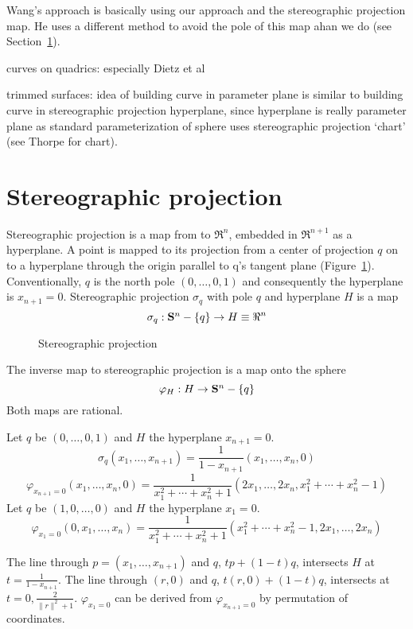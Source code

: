 Wang's approach is basically using our approach and the stereographic projection map.
He uses a different method to avoid the pole of this map
ahan we do (see Section~\ref{}).

curves on quadrics: especially Dietz et al

trimmed surfaces: idea of building curve in parameter plane
is similar to building curve in stereographic projection hyperplane,
since hyperplane is really parameter plane as standard parameterization
of sphere uses stereographic projection `chart' (see Thorpe for chart).


\section{Stereographic projection}

Stereographic projection is a map from  to $\Re^n$,
embedded in $\Re^{n+1}$ as a hyperplane.
A point is mapped to its projection from a center of projection $q$ on 
to a hyperplane through the origin parallel to q's tangent plane (Figure~\ref{fig:stereo}).
Conventionally, $q$ is the north pole $(0,\ldots,0,1)$
and consequently the hyperplane is $x_{n+1}=0$.
Stereographic projection $\sigma_q$ with pole $q$ and hyperplane $H$ is
a map
\[	\sigma_q : \mbox{{\bf S}$^{n}$} - \{ q \} \rightarrow H \equiv \Re^n	\]

\begin{figure}
\vspace{2in}
\caption{Stereographic projection}
\label{fig:stereo}
\end{figure}

The inverse map to stereographic projection is a map onto the sphere
\[	\varphi_H : H \rightarrow \mbox{{\bf S}$^{n}$} - \{ q \}	\]
Both maps are rational.

\begin{lemma}
Let $q$ be $(0,\ldots,0,1)$ and $H$ the hyperplane $x_{n+1}=0$.
\[
	\sigma_q (x_1,\ldots,x_{n+1}) = 
	\frac{1}{1-x_{n+1}} (x_1, \ldots, x_n, 0)
\]
\[
	\varphi_{x_{n+1}=0} (x_1,\ldots,x_n,0) = 
	\frac{1}{x_1^2 + \cdots + x_n^2 + 1} 
	(2x_1, \ldots, 2x_n, x_1^2 + \cdots + x_n^2 - 1)
\]	%
Let $q$ be $(1,0,\ldots,0)$ and $H$ the hyperplane $x_1=0$.
\[
	\varphi_{x_1=0} (0,x_1,\ldots,x_n) =
	\frac{1}{x_1^2 + \cdots + x_n^2 + 1} 
	(x_1^2 + \cdots + x_n^2 - 1, 2x_1, \ldots, 2x_n)
\]
\end{lemma}
\prf
The line through $p = (x_1,\ldots,x_{n+1})$ and $q$, $tp + (1-t)q$,
intersects $H$ at $t = \frac{1}{1 - x_{n+1}}$.
The line through $(r,0)$ and $q$, $t(r,0) + (1-t)q$,
intersects  at $t=0,\frac{2}{\|r\|^2 + 1}$.
$\varphi_{x_1=0}$ can be derived from $\varphi_{x_{n+1}=0}$
by permutation of coordinates.
\QED

